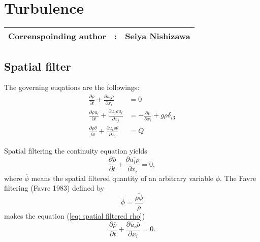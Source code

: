%

\section{Turbulence}
{\bf \Large
\begin{tabular}{ccc}
\hline
  Correnspoinding author & : & Seiya Nishizawa\\
\hline
\end{tabular}
}

\def\half{\frac{1}{2}}

\subsection{Spatial filter}

The governing euqations are the followings:
\begin{align}
  \frac{\partial\rho}{\partial t} + \frac{\partial u_i \rho}{\partial x_i}
  &= 0 \\
  \frac{\partial\rho u_i}{\partial t}
  + \frac{\partial u_j \rho u_i}{\partial x_j}
  &= -\frac{\partial p}{\partial x_i} + g \rho \delta_{i3} \\
  \frac{\partial\rho \theta}{\partial t}
  + \frac{\partial u_i \rho \theta}{\partial x_i}
  &= Q
\end{align}

Spatial filtering the continuity equation yields
\begin{equation}
  \frac{\partial \overline{\rho}}{\partial t} + \frac{\partial \overline{u_i \rho}}{\partial x_i} = 0, \label{eq: spatial filtered rho}
\end{equation}
where $\overline{\phi}$ means the spatial filtered quantity of an arbitrary variable $\phi$.
The Favre filtering (Favre 1983) defined by
\begin{equation}
  \widetilde{\phi} = \frac{\overline{\rho \phi}}{\overline{\rho}}
\end{equation}
makes the equation (\ref{eq: spatial filtered rho})
\begin{equation}
  \frac{\partial \overline{\rho}}{\partial t} + \frac{\partial \widetilde{u_i}\overline{\rho}}{\partial x_i} = 0.
\end{equation}


